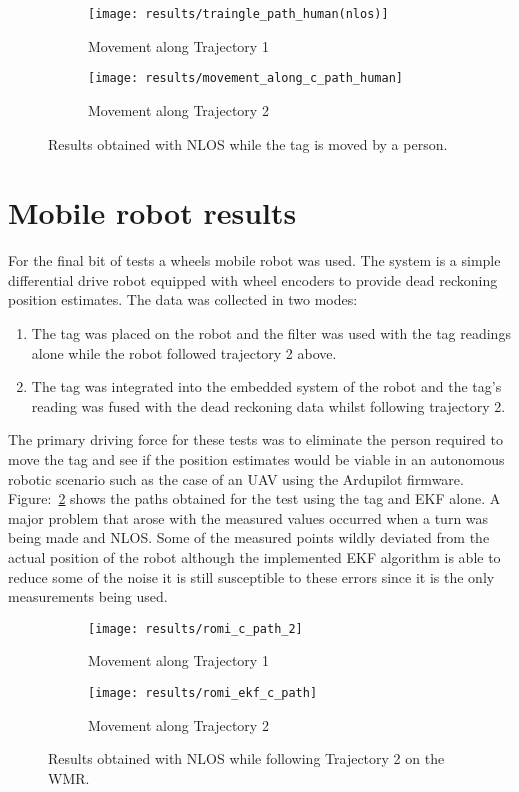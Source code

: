 \begin{figure}[ht!]
    \centering
    \begin{subfigure}{0.7\textwidth}
            \texttt{[image: results/traingle\_path\_human(nlos)]}
            \caption{Movement along Trajectory 1}
    \end{subfigure}
    \begin{subfigure}{0.7\textwidth}
            \texttt{[image: results/movement\_along\_c\_path\_human]}
            \caption{Movement along Trajectory 2}
    \end{subfigure}
    \caption{Results obtained with NLOS while the tag is moved by a person.}
    \label{fig:nlos_ppl}
\end{figure}
\newpage
\section{Mobile robot results}\label{sec:mobile-robot-results}
For the final bit of tests a wheels mobile robot was used.
The system is a simple differential drive robot equipped with wheel encoders to provide dead reckoning position estimates.
The data was collected in two modes:
\begin{enumerate}
    \item The tag was placed on the robot and the filter was used with the tag readings alone while the robot followed trajectory 2 above.
    \item The tag was integrated into the embedded system of the robot and the tag's reading was fused with the dead reckoning data whilst following trajectory 2.
\end{enumerate}
The primary driving force for these tests was to eliminate the person required to move the tag and see if the position estimates would be viable in an autonomous robotic scenario such as the case of an UAV using the Ardupilot firmware.
Figure:~\ref{fig:romi_nlos_1} shows the paths obtained for the test using the tag and EKF alone.
A major problem that arose with the measured values occurred when a turn was being made and NLOS.
Some of the measured points wildly deviated from the actual position of the robot although the implemented EKF algorithm is able to reduce some of the noise it is still susceptible to these errors since it is the only measurements being used.
\begin{figure}[ht!]
    \centering
    \begin{subfigure}{0.7\textwidth}
            \texttt{[image: results/romi\_c\_path\_2]}
            \caption{Movement along Trajectory 1}
    \end{subfigure}
    \begin{subfigure}{0.7\textwidth}
            \texttt{[image: results/romi\_ekf\_c\_path]}
            \caption{Movement along Trajectory 2}
    \end{subfigure}
    \caption{Results obtained with NLOS while following Trajectory 2 on the WMR.}
    \label{fig:romi_nlos_1}
\end{figure}

